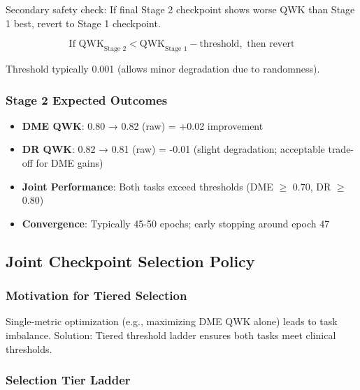 \documentclass[12pt,a4paper]{article}
\begin{document}
Secondary safety check: If final Stage 2 checkpoint shows worse QWK than Stage 1 best, revert to Stage 1 checkpoint.

\begin{equation}
\text{If } \text{QWK}_{\text{Stage 2}} < \text{QWK}_{\text{Stage 1}} - \text{threshold}, \text{ then revert}
\end{equation}

Threshold typically 0.001 (allows minor degradation due to randomness).

\subsubsection{Stage 2 Expected Outcomes}

\begin{itemize}
    \item \textbf{DME QWK}: 0.80 → 0.82 (raw) = +0.02 improvement
    \item \textbf{DR QWK}: 0.82 → 0.81 (raw) = -0.01 (slight degradation; acceptable trade-off for DME gains)
    \item \textbf{Joint Performance}: Both tasks exceed thresholds (DME $\geq$ 0.70, DR $\geq$ 0.80)
    \item \textbf{Convergence}: Typically 45-50 epochs; early stopping around epoch 47
\end{itemize}

\subsection{Joint Checkpoint Selection Policy}

\subsubsection{Motivation for Tiered Selection}

Single-metric optimization (e.g., maximizing DME QWK alone) leads to task imbalance. Solution: Tiered threshold ladder ensures both tasks meet clinical thresholds.

\subsubsection{Selection Tier Ladder}
\end{document}
